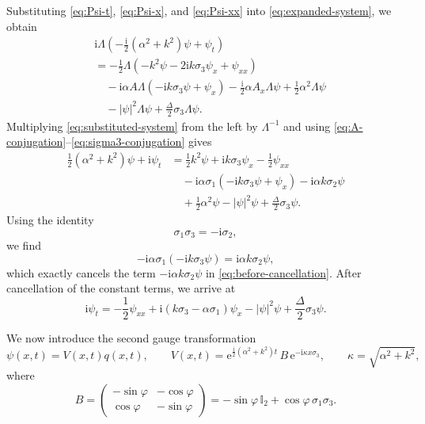 \documentclass{amsart}
\numberwithin{equation}{hw}
\begin{document}
Substituting \eqref{eq:Psi-t}, \eqref{eq:Psi-x}, and \eqref{eq:Psi-xx} into \eqref{eq:expanded-system}, we obtain
\begin{align}
&\mathrm{i}\Lambda
\left(
-\frac{\mathrm{i}}{2}(\alpha^2+k^2)\psi+\psi_t
\right)
\nonumber\\
&=
-\frac12
\Lambda
\left(
-k^2\psi
-2\mathrm{i}k\sigma_3\psi_x
+\psi_{xx}
\right)
\nonumber\\
&\quad
-\mathrm{i}\alpha A\Lambda
\left(
-\mathrm{i}k\sigma_3\psi+\psi_x
\right)
-\frac{\mathrm{i}}{2}\alpha A_x\Lambda\psi
+\frac12\alpha^2\Lambda\psi
\nonumber\\
&\quad
-|\psi|^2\Lambda\psi
+\frac{\Delta}{2}\sigma_3\Lambda\psi.
\label{eq:substituted-system}
\end{align}
Multiplying \eqref{eq:substituted-system} from the left by $\Lambda^{-1}$ and using
\eqref{eq:A-conjugation}--\eqref{eq:sigma3-conjugation} gives
\begin{align}
\frac12(\alpha^2+k^2)\psi+\mathrm{i}\psi_t
&=
\frac12k^2\psi
+\mathrm{i}k\sigma_3\psi_x
-\frac12\psi_{xx}
\nonumber\\
&\quad
-\mathrm{i}\alpha\sigma_1
\left(
-\mathrm{i}k\sigma_3\psi+\psi_x
\right)
-\mathrm{i}\alpha k\sigma_2\psi
\nonumber\\
&\quad
+\frac12\alpha^2\psi
-|\psi|^2\psi
+\frac{\Delta}{2}\sigma_3\psi.
\label{eq:before-cancellation}
\end{align}
Using the identity
\begin{equation}
\sigma_1\sigma_3=-\mathrm{i}\sigma_2,
\label{eq:pauli-identity}
\end{equation}
we find
\begin{equation}
-\mathrm{i}\alpha\sigma_1(-\mathrm{i}k\sigma_3\psi)
=
\mathrm{i}\alpha k\sigma_2\psi,
\end{equation}
which exactly cancels the term
\(
-\mathrm{i}\alpha k\sigma_2\psi
\)
in \eqref{eq:before-cancellation}. After cancellation of the constant terms, we arrive at
\begin{equation}
\mathrm{i}\psi_t
=
-\frac12\psi_{xx}
+\mathrm{i}(k\sigma_3-\alpha\sigma_1)\psi_x
-|\psi|^2\psi
+\frac{\Delta}{2}\sigma_3\psi.
\label{eq:first-transformed-system}
\end{equation}


We now introduce the second gauge transformation
\begin{equation}
\psi(x,t)
=
V(x,t)q(x,t),
\qquad
V(x,t)
=
{\mathrm e}^{\frac{\mathrm{i}}{2}(\alpha^2+k^2)t}\,
B\,
{\mathrm e}^{-\mathrm{i}\kappa x\sigma_3},
\qquad
\kappa=\sqrt{\alpha^2+k^2},
\label{eq:second-gauge}
\end{equation}
where
\begin{equation}
B=
\begin{pmatrix}
-\sin\varphi & -\cos\varphi
\\
\cos\varphi & -\sin\varphi
\end{pmatrix}
=
-\sin\varphi\,\mathbb{I}_2
+
\cos\varphi\,\sigma_1\sigma_3.
\label{eq:B-matrix}
\end{equation}
\end{document}
